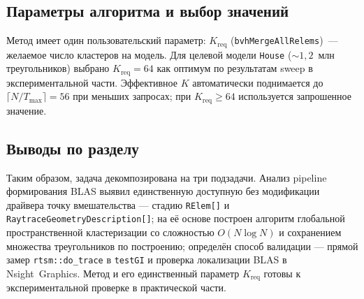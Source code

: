 \subsection{Параметры алгоритма и выбор значений}

Метод имеет один пользовательский параметр:
\textbf{$K_{\text{req}}$} (\texttt{bvhMergeAllRelems})~--- желаемое число
кластеров на модель. Для целевой модели \texttt{House}
($\sim 1{,}2$~млн треугольников) выбрано $K_{\text{req}}\!=\!64$ как
оптимум по результатам sweep в экспериментальной части.
Эффективное $K$ автоматически поднимается до
$\lceil N/T_{\max}\rceil\!=\!56$ при меньших запросах;
при $K_{\text{req}}\!\ge\!64$ используется запрошенное значение.

\subsection{Выводы по разделу}

Таким образом, задача декомпозирована на три подзадачи. Анализ
pipeline формирования BLAS выявил единственную доступную без модификации драйвера
точку вмешательства --- стадию
\texttt{RElem[]} и \texttt{RaytraceGeometryDescription[]}; на её
основе построен алгоритм глобальной пространственной кластеризации
со сложностью $O(N\log N)$ и сохранением множества треугольников по
построению; определён способ валидации --- прямой замер
\texttt{rtsm::do\_trace} в \texttt{testGI} и проверка локализации BLAS в
Nsight~Graphics. Метод и его единственный параметр $K_{\text{req}}$
готовы к экспериментальной проверке в практической части.
